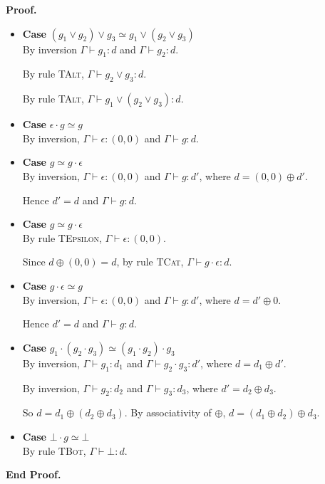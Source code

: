 \documentclass{article}
\newcommand{\judgebalance}[3][\Gamma]{{#1} \vdash {#2} : {#3}}
\newcommand{\combine}[2]{{#1} \oplus {#2}}
\newcommand{\zero}{(0,0)}
\newenvironment{proof}{\noindent\textbf{Proof.}}{\noindent\textbf{End Proof.}}
\newenvironment{caseblock}{\begin{itemize}}{\end{itemize}}
\newenvironment{case}[1]{\item \textbf{Case} {#1}\\}{}
\begin{document}
\begin{proof}
\begin{caseblock}
\begin{case}{$(g_1 \vee g_2) \vee g_3 \simeq g_1 \vee (g_2 \vee g_3)$}
      By inversion $\judgebalance{g_1}{d}$ and $\judgebalance{g_2}{d}$.

      By rule \textsc{TAlt}, $\judgebalance{g_2 \vee g_3}{d}$.
      
      By rule \textsc{TAlt}, $\judgebalance{g_1 \vee (g_2 \vee g_3)}{d}$. 
    \end{case}

    \begin{case}{$\epsilon\cdot g \simeq g$}
      By inversion, $\judgebalance{\epsilon}{\zero}$ and $\judgebalance{g}{d}$. 
    \end{case}

    \begin{case}{$g \simeq g\cdot\epsilon$}
      By inversion, $\judgebalance{\epsilon}{\zero}$ and $\judgebalance{g}{d'}$,
      where $d = \combine{\zero}{d'}$. 

      Hence $d' = d$ and $\judgebalance{g}{d}$. 
    \end{case}
    

    \begin{case}{$g \simeq g \cdot \epsilon$}
      By rule \textsc{TEpsilon}, $\judgebalance{\epsilon}{\zero}$. 

      Since $\combine{d}{\zero} = d$, by rule \textsc{TCat}, $\judgebalance{g \cdot \epsilon}{d}$. 
    \end{case}

    \begin{case}{$g\cdot\epsilon \simeq g$}
      By inversion, $\judgebalance{\epsilon}{\zero}$ and $\judgebalance{g}{d'}$,
      where $d = \combine{d'}{0}$. 

      Hence $d' = d$ and $\judgebalance{g}{d}$. 
    \end{case}
    
    \begin{case}{$g_1\cdot(g_2\cdot g_3) \simeq (g_1\cdot g_2)\cdot g_3$}
      By inversion, $\judgebalance{g_1}{d_1}$ and $\judgebalance{g_2\cdot g_3}{d'}$, 
      where $d = \combine{d_1}{d'}$. 
      
      By inversion, $\judgebalance{g_2}{d_2}$ and $\judgebalance{g_3}{d_3}$, where
      $d' = \combine{d_2}{d_3}$. 

      So $d = \combine{d_1}{(\combine{d_2}{d_3})}$. By associativity of $\oplus$, 
      $d = \combine{(\combine{d_1}{d_2})}{d_3}$. 
    \end{case}

    \begin{case}{$\bot \cdot g \simeq \bot$}
      By rule \textsc{TBot}, $\judgebalance{\bot}{d}$.
    \end{case}


\end{caseblock}
\end{proof}
\end{document}
